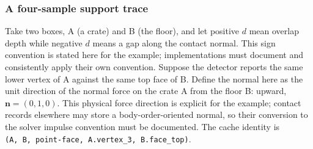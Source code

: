 \subsubsection{A four-sample support trace}\label{06-engine-ii-ch033-a-four-sample-support-trace}

\hypertarget{06-engine-ii-ch033-a-four-sample-support-trace}{}

Take two boxes, A (a crate) and B (the floor), and let positive \(d\) mean overlap depth while negative \(d\) means a gap along the contact normal. This sign convention is stated here for the example; implementations must document and consistently apply their own convention. Suppose the detector reports the same lower vertex of A against the same top face of B. Define the normal here as the unit direction of the normal force on the crate A from the floor B: upward, \(\mathbf n=(0,1,0)\). This physical force direction is explicit for the example; contact records elsewhere may store a body-order-oriented normal, so their conversion to the solver impulse convention must be documented. The cache identity is \texttt{(A,\ B,\ point-face,\ A.vertex\_3,\ B.face\_top)}.

